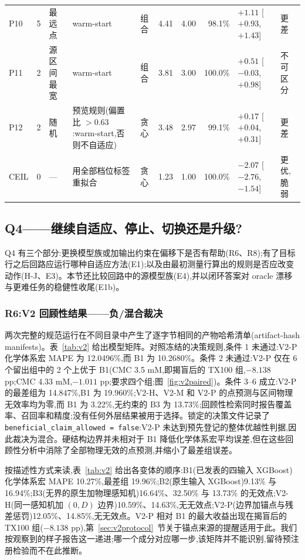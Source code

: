 \documentclass[11pt,a4paper]{ctexart}
\begin{document}
\begin{table}[htbp]
{\begin{tabular}{@{}lclllrrrll@{}}
P10 & 5 & 最远点 & warm-start & 组合 & 4.41 & 4.00 & 98.1\% & $+1.11$ [$+0.93$, $+1.43$] & 更差 \\
P11 & 2 & 源区间最宽 & warm-start & 组合 & 3.81 & 3.00 & 100.0\% & $+0.51$ [$-0.03$, $+0.98$] & 不可区分 \\
P12 & 2 & 随机 & 预览规则(偏置比 $>0.63$:warm-start,否则不自适应) & 贪心 & 3.48 & 2.97 & 99.1\% & $+0.17$ [$+0.04$, $+0.31$] & 更差 \\
CEIL & 0 & --- & 用全部档位标签重拟合 & 贪心 & 1.23 & 1.00 & 100.0\% & $-2.07$ [$-2.76$, $-1.54$] & 更优,脆弱 \\
\bottomrule
\end{tabular}}

\end{table}
\subsection{Q4——继续自适应、停止、切换还是升级?}
\label{sec:q4}
Q4 有三个部分:更换模型族或加输出约束在偏移下是否有帮助(R6、R8);有了目标行之后回路应运行哪种自适应方法(E1);以及由最初测量行算出的规则是否应改变动作(H-J、E3)。本节还比较回路中的源模型族(E4),并以闭环答案对 oracle 漂移与更难任务的稳健性收尾(E1b)。

\subsubsection{R6:V2 回顾性结果——负/混合裁决}
\label{sec:r6}

两次完整的规范运行在不同目录中产生了逐字节相同的产物哈希清单(artifact-hash manifests)。表~\ref{tab:v2} 给出模型矩阵。对照冻结的决策规则,条件 1 未通过:V2-P 化学体系宏 MAPE 为 12.0496\%,而 B1 为 10.2680\%。条件 2 未通过:V2-P 仅在 6 个留出组中的 2 个上优于 B1(CMC 3.5 mM,即揭盲后的 TX100 组,$-8.138$ pp;CMC 4.33 mM,$-1.011$ pp;要求四个组;图~\ref{fig:v2paired})。条件 3–6 成立:V2-P 的最差组为 14.847\%,B1 为 19.960\%;V2-H、V2-M 和 V2-P 的点预测与区间物理无效率均为零,而 B1 为 3.22\%,无约束的 B3 为 13.73\%;回顾性检索同时报告覆盖率、召回率和精度;没有任何外层结果被用于选择。锁定的决策文件记录了 \texttt{beneficial\_claim\_allowed = false}:V2-P 未达到预先登记的整体优越性判据,因此裁决为混合。硬结构边界并未相对于 B1 降低化学体系宏平均误差,但在这些回顾性分析中消除了全部物理无效的点预测,并缩小了最差组误差。

按描述性方式来读,表~\ref{tab:v2} 给出各变体的顺序:B1(已发表的四输入 XGBoost)化学体系宏 MAPE 10.27\%,最差组 19.96\%;B2(原生输入 XGBoost)9.13\% 与 16.94\%;B3(无界的原生加物理感知机)16.64\%、32.50\% 与 13.73\% 的无效点;V2-H(同一感知机加 $(0,D)$ 边界)10.59\%、14.63\%,无无效点;V2-P(边界加锚点与残差惩罚)12.05\%、14.85\%,无无效点。V2-P 相对 B1 的最大收益出现在揭盲后的 TX100 组($-8.138$ pp),第~\ref{sec:v2protocol}~节关于锚点来源的提醒适用于此。我们按观察到的样子报告这一递进;哪一个成分对应哪一步,该矩阵并不能识别,留待预注册检验而不在此推断。
\end{document}
